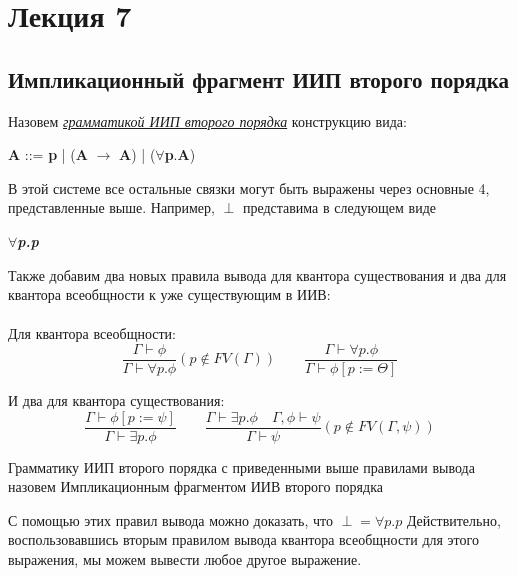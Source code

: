 \section{Лекция 7}
	\subsection{Импликационный фрагмент ИИП второго порядка}
 	\begin{center}
 		\begin{definition}
 			Назовем \textit{\underline{грамматикой ИИП второго порядка}} конструкцию вида: 
 		\end{definition}
 	\textbf{A} ::=
 	\textbf{p} |
	(\textbf{A} $\rightarrow$ \textbf{A}) |
	($\forall$\textbf{p}.\textbf{A})
 	
 	\end{center}
 
 	В этой системе все остальные связки могут быть выражены через основные 4, представленные выше. Например, $\perp$ представима в следующем виде
 	\begin{center}
 		{\textbf{\textsl\textit{$\forall$p.p}}} \\
 	\end{center}
 	
 	
 	 Также добавим два новых правила вывода для квантора существования и два для квантора всеобщности к уже существующим в ИИВ: \\ \\
 	
	Для квантора всеобщности: \\ 
 	
    \[ \dfrac{\Gamma\vdash\phi}{\Gamma\vdash\forall p.\phi} (p\notin FV(\Gamma)) \qquad
        \dfrac{\Gamma\vdash\forall p.\phi}{\Gamma\vdash\phi[p:=\Theta]} \]
 	
 	 И два для квантора существования: \\
 	
    \[ \dfrac{\Gamma\vdash\phi[p:= \psi]}{\Gamma\vdash\exists p.\phi}\qquad
        \dfrac{\Gamma\vdash\exists p.\phi\quad\Gamma, \phi\vdash\psi}{\Gamma\vdash\psi} (p\notin FV(\Gamma, \psi)) \]
 	
 	
 	\begin{definition}
 		Грамматику ИИП второго порядка с приведенными выше правилами вывода назовем Импликационным фрагментом ИИВ второго порядка\\ 
 	\end{definition}
	{С помощью этих правил вывода можно доказать, что \textbf{${\perp = \forall p.p}$}
		Действительно, воспользовавшись вторым правилом вывода квантора всеобщности для этого выражения, мы можем вывести любое другое выражение.}
 	
